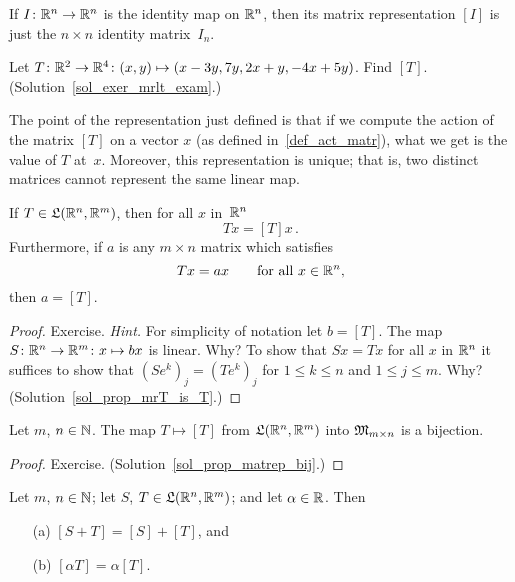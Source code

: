 \begin{exam} If $I \colon \mathbb{R}^n \rightarrow \mathbb{R}^n$ is the identity map on $\mathbb{R}^n$, then its matrix
representation $[I]$ is just the $n \times n$ identity matrix~$I_n$.
\end{exam}

\begin{exer}\label{exer_mrlt_exam}  Let $T \colon \mathbb{R}^2 \rightarrow \mathbb{R}^4 \colon  (x,y) \mapsto
(x - 3y, 7y, 2x + y, -4x + 5y)$.  Find $[T]$.  (Solution~\ref{sol_exer_mrlt_exam}.)

\end{exer}

The point of the representation just defined is that if we compute the action of the matrix
$[T]$ on a vector $x$ (as defined in~\ref{def_act_matr}), what we get is the value of $T$
at~$x$. Moreover, this representation is unique; that is, two distinct matrices cannot
represent the same linear map.

\begin{prop}\label{prop_mrT_is_T} If $T \in \mathfrak{L}(\mathbb{R}^n,\mathbb{R}^m)$, then for all $x$ in~$\mathbb{R}^n$
  \[ Tx = [T]x\,. \]
Furthermore, if $a$ is any $m \times n$ matrix which satisfies
  \[ Tx = ax  \qquad \text{for all $x \in \mathbb{R}^n$},  \]
then $a = [T]$.
\end{prop}

\begin{proof} Exercise. \emph{Hint.}  For simplicity of notation let $b = [T]$.  The map
$S \colon \mathbb{R}^n \rightarrow \mathbb{R}^m \colon  x \mapsto bx$ is linear. Why?  To show that $Sx = Tx$ for all
$x$ in $\mathbb{R}^n$ it suffices to show that $(Se^k)_j = (Te^k)_j$ for $1 \le k \le n$ and $1 \le j
\le m$.  Why? (Solution~\ref{sol_prop_mrT_is_T}.)  \ns
\end{proof}

\begin{prop}\label{prop_matrep_bij}  Let $m$, $n \in \mathbb{N}$.  The map $T \mapsto [T]$ from
$\mathfrak{L}(\mathbb{R}^n,\mathbb{R}^m)$ into $\mathfrak{M}_{m \times n}$ is a bijection.
\end{prop}

\begin{proof} Exercise.  (Solution~\ref{sol_prop_matrep_bij}.)  \ns  \end{proof}

\begin{prop}\label{prop_arith_matrep}  Let $m$, $n \in \mathbb{N}$; let $S$, $T \in \mathfrak{L}(\mathbb{R}^n,\mathbb{R}^m)$;
and let $\alpha \in \mathbb{R}$.  Then
 \begin{enumerate}
  \item[(a)] $[S + T] = [S] + [T]$, and
  \item[(b)] $[\alpha T] = \alpha [T]$.
 \end{enumerate}
\end{prop}


